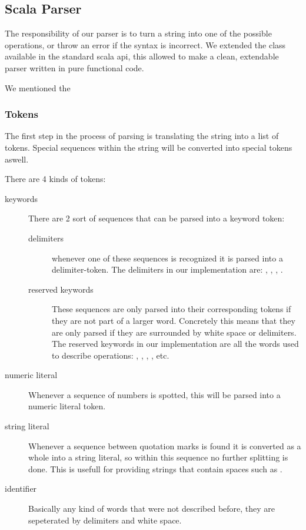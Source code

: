 \subsection{Scala Parser}

The responsibility of our parser is to turn a string into one of the possible
operations, or throw an error if the syntax is incorrect. We extended the
 class available in the standard scala api, this
allowed to make a clean, extendable parser written in pure functional code.

We mentioned the 

\subsubsection{Tokens} 

The first step in the process of parsing is translating the string into a list
of tokens. Special sequences within the string will be converted into special
tokens aswell.

\par
There are 4 kinds of tokens:
\begin{description} 
\item[keywords] There are 2 sort of sequences that can be parsed into a keyword
token:
	\begin{description}
	\item[delimiters] whenever one of these sequences is recognized it is parsed
	into a delimiter-token. The delimiters in our implementation are: \sn{\{},
	\sn{\}}, \sn{,}, \sn{:}.
	\item[reserved keywords] These sequences are only parsed into their
	corresponding tokens if they are not part of a larger word. Concretely this
	means that they are only parsed if they are surrounded by white space or
	delimiters. The reserved keywords in our implementation are all the words used
	to describe operations: , , , , etc.
	\end{description}
\item[numeric literal] Whenever a sequence of numbers is spotted, this will be
parsed into a numeric literal token.
\item[string literal] Whenever a sequence between quotation marks is found it is
converted as a whole into a string literal, so within this sequence no further
splitting is done. This is usefull for providing strings that contain spaces
such as .
\item[identifier] Basically any kind of words that were not described before,
they are sepeterated by delimiters and white space.
\end{description}
	
